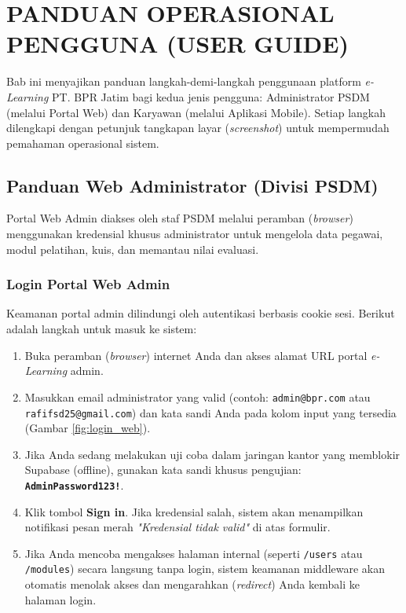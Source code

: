 \chapter{PANDUAN OPERASIONAL PENGGUNA (USER GUIDE)}

Bab ini menyajikan panduan langkah-demi-langkah penggunaan platform \textit{e-Learning} PT. BPR Jatim bagi kedua jenis pengguna: Administrator PSDM (melalui Portal Web) dan Karyawan (melalui Aplikasi Mobile). Setiap langkah dilengkapi dengan petunjuk tangkapan layar (\textit{screenshot}) untuk mempermudah pemahaman operasional sistem.

\section{Panduan Web Administrator (Divisi PSDM)}
Portal Web Admin diakses oleh staf PSDM melalui peramban (\textit{browser}) menggunakan kredensial khusus administrator untuk mengelola data pegawai, modul pelatihan, kuis, dan memantau nilai evaluasi.

\subsection{Login Portal Web Admin}
Keamanan portal admin dilindungi oleh autentikasi berbasis cookie sesi. Berikut adalah langkah untuk masuk ke sistem:
\begin{enumerate}
    \item Buka peramban (\textit{browser}) internet Anda dan akses alamat URL portal \textit{e-Learning} admin.
    \item Masukkan email administrator yang valid (contoh: \texttt{admin@bpr.com} atau \texttt{rafifsd25@gmail.com}) dan kata sandi Anda pada kolom input yang tersedia (Gambar \ref{fig:login_web}).
    \item Jika Anda sedang melakukan uji coba dalam jaringan kantor yang memblokir Supabase (offline), gunakan kata sandi khusus pengujian: \textbf{\texttt{AdminPassword123!}}.
    \item Klik tombol \textbf{Sign in}. Jika kredensial salah, sistem akan menampilkan notifikasi pesan merah \textit{"Kredensial tidak valid"} di atas formulir.
    \item Jika Anda mencoba mengakses halaman internal (seperti \texttt{/users} atau \texttt{/modules}) secara langsung tanpa login, sistem keamanan middleware akan otomatis menolak akses dan mengarahkan (\textit{redirect}) Anda kembali ke halaman login.
\end{enumerate}

